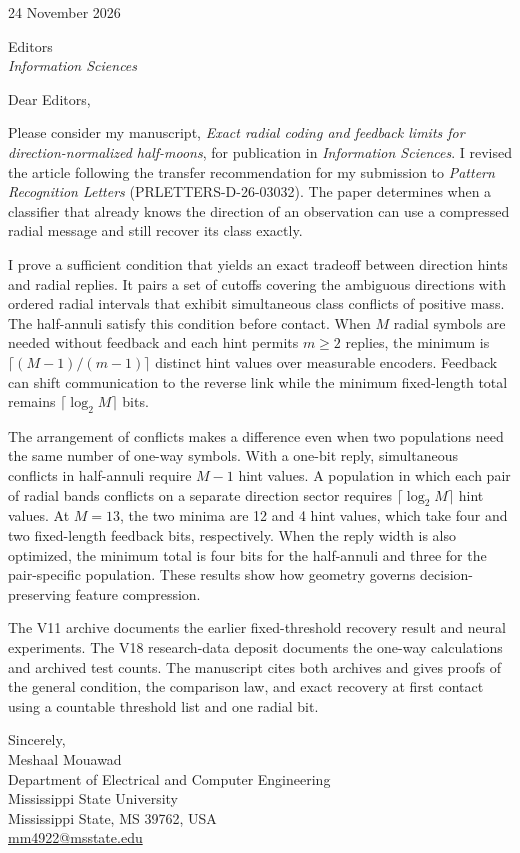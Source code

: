 \documentclass[11pt,a4paper]{article}
\begin{document}
\begin{flushright}
24 November 2026
\end{flushright}

Editors\\
\textit{Information Sciences}

Dear Editors,

Please consider my manuscript, \emph{Exact radial coding and feedback limits for direction-normalized half-moons}, for publication in \emph{Information Sciences}. I revised the article following the transfer recommendation for my submission to \emph{Pattern Recognition Letters} (\mbox{PRLETTERS-D-26-03032}). The paper determines when a classifier that already knows the direction of an observation can use a compressed radial message and still recover its class exactly.

I prove a sufficient condition that yields an exact tradeoff between direction hints and radial replies. It pairs a set of cutoffs covering the ambiguous directions with ordered radial intervals that exhibit simultaneous class conflicts of positive mass. The half-annuli satisfy this condition before contact. When $M$ radial symbols are needed without feedback and each hint permits $m\ge2$ replies, the minimum is $\lceil(M-1)/(m-1)\rceil$ distinct hint values over measurable encoders. Feedback can shift communication to the reverse link while the minimum fixed-length total remains $\lceil\log_2 M\rceil$ bits.

The arrangement of conflicts makes a difference even when two populations need the same number of one-way symbols. With a one-bit reply, simultaneous conflicts in half-annuli require $M-1$ hint values. A population in which each pair of radial bands conflicts on a separate direction sector requires $\lceil\log_2 M\rceil$ hint values. At $M=13$, the two minima are 12 and 4 hint values, which take four and two fixed-length feedback bits, respectively. When the reply width is also optimized, the minimum total is four bits for the half-annuli and three for the pair-specific population. These results show how geometry governs decision-preserving feature compression.

The V11 archive documents the earlier fixed-threshold recovery result and neural experiments. The V18 research-data deposit documents the one-way calculations and archived test counts. The manuscript cites both archives and gives proofs of the general condition, the comparison law, and exact recovery at first contact using a countable threshold list and one radial bit.

Sincerely,\\[.25em]
Meshaal Mouawad\\
Department of Electrical and Computer Engineering\\
Mississippi State University\\
Mississippi State, MS 39762, USA\\
\href{mailto:mm4922@msstate.edu}{mm4922@msstate.edu}
\end{document}
